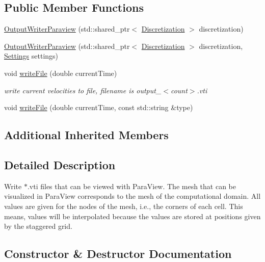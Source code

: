 \subsection*{Public Member Functions}
\begin{DoxyCompactItemize}
\item 
\mbox{\hyperlink{classOutputWriterParaview_a2d6ca95be656cceed115a4cfbb95b13a}{Output\+Writer\+Paraview}} (std\+::shared\+\_\+ptr$<$ \mbox{\hyperlink{classDiscretization}{Discretization}} $>$ discretization)
\item 
\mbox{\hyperlink{classOutputWriterParaview_abf652df2ff830523dc838a476f39b379}{Output\+Writer\+Paraview}} (std\+::shared\+\_\+ptr$<$ \mbox{\hyperlink{classDiscretization}{Discretization}} $>$ discretization, \mbox{\hyperlink{structSettings}{Settings}} settings)
\item 
void \mbox{\hyperlink{classOutputWriterParaview_a9e203b63d0e2f26ad53d18ee1821c6bb}{write\+File}} (double current\+Time)
\begin{DoxyCompactList}\small\item\em write current velocities to file, filename is output\+\_\+$<$count$>$.\+vti \end{DoxyCompactList}\item 
void \mbox{\hyperlink{classOutputWriterParaview_a7435aa313465ac178a5c55d68a2534b5}{write\+File}} (double current\+Time, const std\+::string \&type)
\end{DoxyCompactItemize}
\subsection*{Additional Inherited Members}


\subsection{Detailed Description}
Write $\ast$.vti files that can be viewed with Para\+View. The mesh that can be visualized in Para\+View corresponds to the mesh of the computational domain. All values are given for the nodes of the mesh, i.\+e., the corners of each cell. This means, values will be interpolated because the values are stored at positions given by the staggered grid. 

\subsection{Constructor \& Destructor Documentation}
\mbox{\label{classOutputWriterParaview_a2d6ca95be656cceed115a4cfbb95b13a}} 
